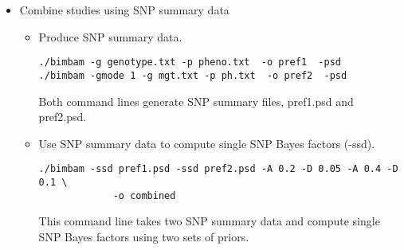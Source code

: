 \documentclass[11pt,Palatino]{article}
\begin{document}
\begin{itemize}
\item {\sc Combine studies using SNP summary data}
\begin{itemize}
\item Produce SNP summary data.
\begin{verbatim}
./bimbam -g genotype.txt -p pheno.txt  -o pref1  -psd
./bimbam -gmode 1 -g mgt.txt -p ph.txt  -o pref2  -psd  
\end{verbatim}
Both command lines generate SNP summary files, pref1.psd and pref2.psd.

\item Use SNP summary data to compute single SNP Bayes factors (-ssd).
\begin{verbatim}
./bimbam -ssd pref1.psd -ssd pref2.psd -A 0.2 -D 0.05 -A 0.4 -D 0.1 \
             -o combined
\end{verbatim}
This command line takes two SNP summary data and compute single SNP Bayes factors using two sets of priors.
\end{itemize}

\end{itemize}

\def\arg{{\emph{arg}}}
\def\num{{\emph{num}}}

\newpage
\end{document}
